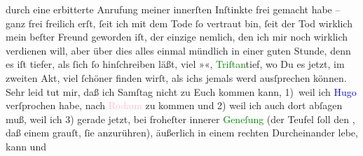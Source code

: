               durch eine erbitterte Anrufung meiner innerſten Inſtinkte \label{LL287-2v}frei gemacht habe – ganz frei freilich erſt, ſeit ich mit dem
                  Tode ſo vertraut bin, ſeit der Tod wirklich mein beſter Freund geworden
                  iſt\label{LL287-2h}, der einzige nemlich, den ich mir noch wirklich verdienen will,
                  \label{LL287-3v}aber über dies alles einmal mündlich in
                  einer guten Stunde, denn es iſt tiefer, als ſich ſo hinſchreiben läßt, viel
                     »\label{K_L01478_2v}\label{K_L01478_2h}«, \textcolor{green}{Triſtan}{}tief, wo Du es jetzt, im zweiten Akt, viel ſchöner finden {\pb}wirſt, als ichs jemals werd ausſprechen
                  können\label{LL287-3h}.\pend
           \pstart
           Sehr leid tut mir, daß ich Samſtag nicht zu Euch kommen kann, 1) weil ich \textcolor{blue}{Hugo}{}\ledrightnote{\textcolor{blue}{Hugo von Hofmannsthal}} verſprochen habe, nach \textcolor{pink}{Rodaun}{}\ledrightnote{\textcolor{pink}{Rodaun}} zu kommen und 2) weil ich auch dort abſagen muß, weil ich
               3) gerade jetzt, bei froheſter innerer \textcolor{green}{Geneſung}{}\ledrightnote{\textcolor{green}{Genesung. Roman}}
               (der Teufel ſoll den \label{K_L01478_3v}\label{K_L01478_3h}, daß einem grauſt, ſie anzurühren), \label{LL287-1v}äußerlich in einem rechten Durcheinander lebe, \label{K_L01478_4v}\label{K_L01478_4h} kann und
